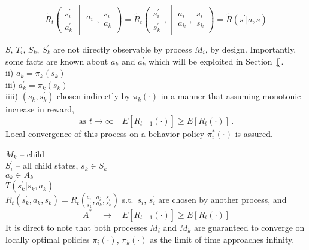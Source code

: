 \begin{equation*}
\tilde{R}_t\left(  \begin{array}{l} s^\prime_i \\ a^\prime_k \end{array}
\middle| 
\begin{array}{c}  a_i \\ \end{array},
\begin{array}{c} s_i \\ a_k \end{array}
\right) 
=
\tilde{R}_t\left( 
\begin{array}{c} s^\prime_i \\ s^\prime_k \end{array}, \middle|
\begin{array}{c} a_i \\ a_k \end{array},
\begin{array}{c} s_i \\ s_k \end{array}
\right)
=
\tilde{R}( s^\prime | a, s )
\end{equation*}


$S$, $T_i$, $S_k$, $S^\prime_k$ are not directly observable by process $M_i$, by design. Importantly, some facts are known about $a_k$ and $a^\prime_k$ which will be exploited in Section~\ref{}.\\

ii) $a_k=\pi_k(s_k)$\\
iii) $a^\prime_k=\pi_k(s_k)$\\
iiii) $\left(s_k,s^\prime_k\right)$ chosen indirectly by $\pi_k(\cdot)$ in a manner that assuming monotonic increase in reward,
\begin{equation*}
  \text{as\ }t \to \infty \quad E[R_{t+1}(\cdot)] \geq E[R_t(\cdot)]\,.
\end{equation*}
Local convergence of this process on a behavior policy $\pi^*_i(\cdot)$ is assured.

\underline{$M_k$ -- child}\\

$S^\prime_i$ -- all child states, $s_k\in S_k$\\
$a_k\in A_k$\\
$\tilde{T}(s^\prime_k|s_k,a_k)$\\
$R_t(s^\prime_k,a_k,s_k)=R_t\left({}^{s_i}_{s^\prime_k},{}^{a_i}_{a_k},{}^{s_i}_{s_k}\right)$
s.t.\ $s_i$, $s^\prime_i$ are chosen by another process, and
\begin{equation*}
\boxed{A^*}\quad\longrightarrow\quad E[R_{t+1}(\cdot)]\geq E[R_t(\cdot)]
\end{equation*}
It is direct to note that both processes $M_i$ and $M_k$ are guaranteed to converge on locally optimal policies $\pi_i(\cdot)$, $\pi_k(\cdot)$ as the limit of time approaches infinity. 


